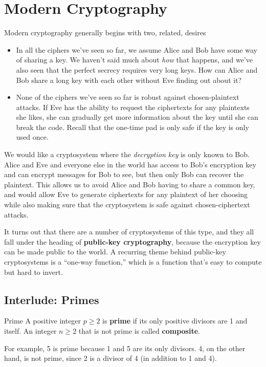 \documentclass[letterpaper]{article}
\begin{document}
\section{Modern Cryptography}
Modern cryptography generally begins with two, related, desires 
\begin{itemize}
    \item In all the ciphers we've seen so far, we assume Alice and Bob have some way of sharing a key. We haven't said much about \emph{how} that happens, and we've also seen that the perfect secrecy requires very long keys. How can Alice and Bob share a long key with each other without Eve finding out about it? 
    \item None of the ciphers we've seen so far is robust against chosen-plaintext attacks. If Eve has the ability to request the ciphertexts for any plaintexts she likes, she can gradually get more information about the key until she can break the code. Recall that the one-time pad is only safe if the key is only used once. 
\end{itemize}
We would like a cryptosystem where the \emph{decryption key} is only known to Bob. Alice and Eve and everyone else in the world has access to Bob's encryption key and can encrypt messages for Bob to see, but then only Bob can recover the plaintext. This allows us to avoid Alice and Bob having to share a common key, and would allow Eve to generate ciphertexts for any plaintext of her choosing while also making sure that the cryptosystem is safe against chosen-ciphertext attacks. 

\bigskip 

It turns out that there are a number of cryptosystems of this type, and they all fall under the heading of \textbf{public-key cryptography}, because the encryption key can be made public to the world. A recurring theme behind public-key cryptosystems is a ``one-way function,'' which is a function that's easy to compute but hard to invert. 

\subsection{Interlude: Primes} 
\begin{definition}{Prime}{}
    A positive integer $p \geq 2$ is \textbf{prime} if its only positive divisors are 1 and itself. An integer $n \geq 2$ that is not prime is called \textbf{composite}.
\end{definition}
For example, 5 is prime because 1 and 5 are its only divisors. 4, on the other hand, is not prime, since 2 is a divisor of 4 (in addition to 1 and 4). 
\end{document}
